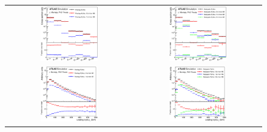 \begin{figure}[tp]
\centering
\begin{tabular}{cc}
  \includegraphics[width=0.47\textwidth]{Modeling/Figures/mepspp_realHFbb_extHFtype.eps} &
  \includegraphics[width=0.47\textwidth]{Modeling/Figures/meps_realHFbb_extHFtype.eps} \\
  \includegraphics[width=0.47\textwidth]{Modeling/Figures/mepspp_tt2bq_q1_pt.eps} & 
  \includegraphics[width=0.47\textwidth]{Modeling/Figures/meps_tt2bq_q1_pt.eps} \\

\end{tabular}
\end{figure}
